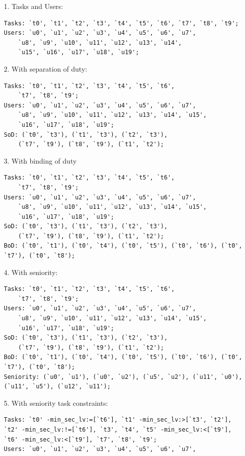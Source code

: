 \documentclass[a4paper]{report}
\begin{document}
\begin{enumerate}
\item[1.] Tasks and Users:
\begin{lstlisting}[frame=single]
Tasks: `t0', `t1', `t2', `t3', `t4', `t5', `t6', `t7', `t8', `t9';
Users: `u0', `u1', `u2', `u3', `u4', `u5', `u6', `u7', 
	`u8', `u9', `u10', `u11', `u12', `u13', `u14', 
	`u15', `u16', `u17', `u18', `u19'; 
\end{lstlisting}
\item[2.] With separation of duty:
\begin{lstlisting}[frame=single]
Tasks: `t0', `t1', `t2', `t3', `t4', `t5', `t6', 
	`t7', `t8', `t9';
Users: `u0', `u1', `u2', `u3', `u4', `u5', `u6', `u7', 
	`u8', `u9', `u10', `u11', `u12', `u13', `u14', `u15', 
	`u16', `u17', `u18', `u19'; 
SoD: (`t0', `t3'), (`t1', `t3'), (`t2', `t3'), 
	(`t7', `t9'), (`t8', `t9'), (`t1', `t2');
\end{lstlisting}
\item[3.] With binding of duty
\begin{lstlisting}[frame=single]
Tasks: `t0', `t1', `t2', `t3', `t4', `t5', `t6', 
	`t7', `t8', `t9';
Users: `u0', `u1', `u2', `u3', `u4', `u5', `u6', `u7', 
	`u8', `u9', `u10', `u11', `u12', `u13', `u14', `u15', 
	`u16', `u17', `u18', `u19'; 
SoD: (`t0', `t3'), (`t1', `t3'), (`t2', `t3'), 
	(`t7', `t9'), (`t8', `t9'), (`t1', `t2');
BoD: (`t0', `t1'), (`t0', `t4'), (`t0', `t5'), (`t0', `t6'), (`t0', `t7'), (`t0', `t8');
\end{lstlisting}
\item[4.] With seniority:
\begin{lstlisting}[frame=single]
Tasks: `t0', `t1', `t2', `t3', `t4', `t5', `t6', 
	`t7', `t8', `t9';
Users: `u0', `u1', `u2', `u3', `u4', `u5', `u6', `u7', 
	`u8', `u9', `u10', `u11', `u12', `u13', `u14', `u15', 
	`u16', `u17', `u18', `u19'; 
SoD: (`t0', `t3'), (`t1', `t3'), (`t2', `t3'), 
	(`t7', `t9'), (`t8', `t9'), (`t1', `t2');
BoD: (`t0', `t1'), (`t0', `t4'), (`t0', `t5'), (`t0', `t6'), (`t0', `t7'), (`t0', `t8');
Seniority: (`u0', `u1'), (`u0', `u2'), (`u5', `u2'), (`u11', `u0'), (`u11', `u5'), (`u12', `u11');
\end{lstlisting}
\item[5.] With seniority task constraints:
\begin{lstlisting}[frame=single]
Tasks: `t0' -min_sec_lv:=[`t6'], `t1' -min_sec_lv:>[`t3', `t2'], `t2' -min_sec_lv:!=[`t6'], `t3', `t4', `t5' -min_sec_lv:<[`t9'], `t6' -min_sec_lv:<[`t9'], `t7', `t8', `t9';
Users: `u0', `u1', `u2', `u3', `u4', `u5', `u6', `u7', 

\end{lstlisting}
\end{enumerate}
\end{document}
